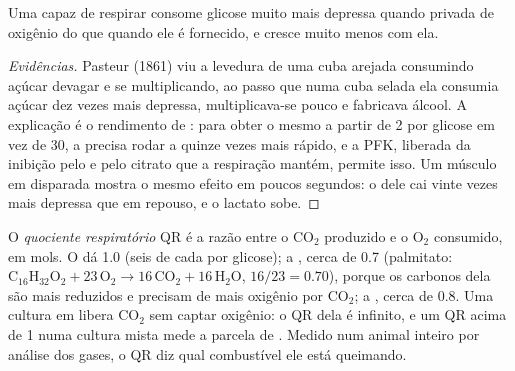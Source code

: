\begin{proposition}\label{prop:b1:respiration-fermentation:pasteur}
Uma  capaz de respirar consome glicose muito mais depressa quando
privada de oxigênio do que quando ele é fornecido, e cresce muito menos
com ela.
\end{proposition}
\begin{proof}[Evidências]
Pasteur (1861) viu a levedura de uma cuba arejada consumindo açúcar
devagar e se multiplicando, ao passo que numa cuba selada ela consumia
açúcar dez vezes mais depressa, multiplicava-se pouco e fabricava
álcool. A explicação é o rendimento de : para obter o mesmo  a
partir de 2 por glicose em vez de 30, a  precisa rodar a 
quinze vezes mais rápido, e a PFK, liberada da inibição pelo  e pelo
citrato que a respiração mantém, permite isso. Um músculo em disparada
mostra o mesmo efeito em poucos segundos: o  dele cai vinte
vezes mais depressa que em repouso, e o lactato sobe.
\end{proof}

\begin{definition}\label{def:b1:respiration-fermentation:rq}
O \emph{quociente respiratório} QR é a razão entre o $\mathrm{CO_2}$
produzido e o $\mathrm{O_2}$ consumido, em mols. O  dá 1.0
(seis de cada por glicose); a , cerca de 0.7 (palmitato:
$\mathrm{C_{16}H_{32}O_2} + 23\,\mathrm{O_2} \to 16\,\mathrm{CO_2} +
16\,\mathrm{H_2O}$, $16/23 = 0.70$), porque os carbonos dela são mais
reduzidos e precisam de mais oxigênio por $\mathrm{CO_2}$; a ,
cerca de 0.8. Uma cultura em  libera $\mathrm{CO_2}$ sem
captar oxigênio: o QR dela é infinito, e um QR acima de 1 numa cultura
mista mede a parcela de . Medido num animal inteiro por
análise dos gases, o QR diz qual combustível ele está queimando.
\end{definition}

